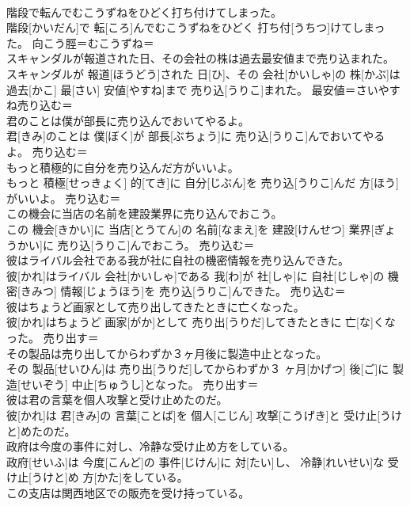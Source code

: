 \documentclass[8pt]{extreport}
\begin{document}
\begin{CJK}{UTF8}{min}
\\	階段で転んでむこうずねをひどく打ち付けてしまった。	
\\	階段[かいだん]で 転[ころ]んでむこうずねをひどく 打ち付[うちつ]けてしまった。	向こう脛＝むこうずね＝ 
\\	スキャンダルが報道された日、その会社の株は過去最安値まで売り込まれた。	
\\	スキャンダルが 報道[ほうどう]された 日[ひ]、その 会社[かいしゃ]の 株[かぶ]は 過去[かこ] 最[さい] 安値[やすね]まで 売り込[うりこ]まれた。	最安値＝さいやすね売り込む＝ 
\\	君のことは僕が部長に売り込んでおいてやるよ。	
\\	君[きみ]のことは 僕[ぼく]が 部長[ぶちょう]に 売り込[うりこ]んでおいてやるよ。	売り込む＝ 
\\	もっと積極的に自分を売り込んだ方がいいよ。	
\\	もっと 積極[せっきょく] 的[てき]に 自分[じぶん]を 売り込[うりこ]んだ 方[ほう]がいいよ。	売り込む＝ 
\\	この機会に当店の名前を建設業界に売り込んでおこう。	
\\	この 機会[きかい]に 当店[とうてん]の 名前[なまえ]を 建設[けんせつ] 業界[ぎょうかい]に 売り込[うりこ]んでおこう。	売り込む＝ 
\\	彼はライバル会社である我が社に自社の機密情報を売り込んできた。	
\\	彼[かれ]はライバル 会社[かいしゃ]である 我[わ]が 社[しゃ]に 自社[じしゃ]の 機密[きみつ] 情報[じょうほう]を 売り込[うりこ]んできた。	売り込む＝ 
\\	彼はちょうど画家として売り出してきたときに亡くなった。	
\\	彼[かれ]はちょうど 画家[がか]として 売り出[うりだ]してきたときに 亡[な]くなった。	売り出す＝ 
\\	その製品は売り出してからわずか３ヶ月後に製造中止となった。	
\\	その 製品[せいひん]は 売り出[うりだ]してからわずか３ ヶ月[かげつ] 後[ご]に 製造[せいぞう] 中止[ちゅうし]となった。	売り出す＝ 
\\	彼は君の言葉を個人攻撃と受け止めたのだ。	
\\	彼[かれ]は 君[きみ]の 言葉[ことば]を 個人[こじん] 攻撃[こうげき]と 受け止[うけと]めたのだ。	
\\	政府は今度の事件に対し、冷静な受け止め方をしている。	
\\	政府[せいふ]は 今度[こんど]の 事件[じけん]に 対[たい]し、 冷静[れいせい]な 受け止[うけと]め 方[かた]をしている。	
\\	この支店は関西地区での販売を受け持っている。	

\end{CJK}
\end{document}
